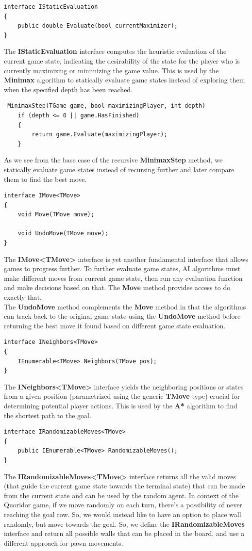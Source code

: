 \begin{lstlisting}
interface IStaticEvaluation
{
    public double Evaluate(bool currentMaximizer);
}
\end{lstlisting}
The \textbf{IStaticEvaluation} interface computes the heuristic evaluation of the current game state, indicating the desirability of the state for the player who is currently maximizing or minimizing the game value. This is used by the \textbf{Minimax} algorithm to statically evaluate game states instead of exploring them when the specified depth has been reached.
\begin{lstlisting}
 MinimaxStep(TGame game, bool maximizingPlayer, int depth)
    if (depth <= 0 || game.HasFinished)
    {
        return game.Evaluate(maximizingPlayer);
    }
\end{lstlisting}
As we see from the base case of the recursive \textbf{MinimaxStep} method, we statically evaluate game states instead of recursing further and later compare them to find the best move.
\begin{lstlisting}
interface IMove<TMove>
{
    void Move(TMove move);

    void UndoMove(TMove move);
}
\end{lstlisting}
The \textbf{IMove\textless{}TMove\textgreater{}} interface is yet another fundamental interface that allows games to progress further. To further evaluate game states, \gls{AI} algorithms must make different moves from current game state, then run any evaluation function and make decisions based on that. The \textbf{Move} method provides access to do exactly that.\\
The \textbf{UndoMove} method complements the \textbf{Move} method in that the algorithms can track back to the original game state using the \textbf{UndoMove} method before returning the best move it found based on different game state evaluation.

\begin{lstlisting}
interface INeighbors<TMove>
{
    IEnumerable<TMove> Neighbors(TMove pos);
}
\end{lstlisting}
The \textbf{INeighbors\textless{}TMove\textgreater{}} interface yields the neighboring positions or states from a given position (parametrized using the generic \textbf{TMove} type) crucial for determining potential player actions. This is used by the \textbf{A*} algorithm to find the shortest path to the goal.

\begin{lstlisting}
interface IRandomizableMoves<TMove>
{
    public IEnumerable<TMove> RandomizableMoves();
}
\end{lstlisting}
The \textbf{IRandomizableMoves\textless{}TMove\textgreater{}} interface returns all the valid moves (that guide the current game state towards the terminal state) that can be made from the current state and can be used by the random agent.
In context of the Quoridor game, if we move randomly on each turn, there's a possibility of never reaching the goal row. So, we would instead like to have an option to place wall randomly, but move towards the goal. So, we define the \textbf{IRandomizableMoves} interface and return all possible walls that can be placed in the board, and use a different approach for pawn movements.


